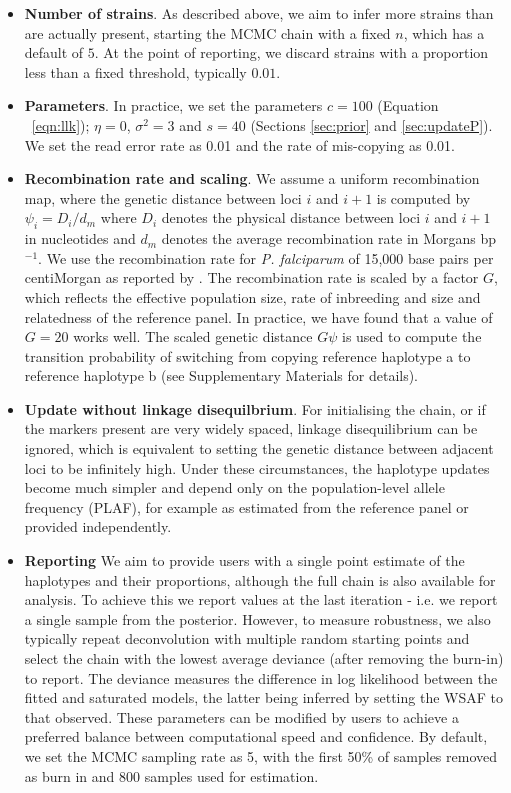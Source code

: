 \documentclass{bioinfo}
\begin{document}
\begin{itemize}
\item {\bf Number of strains}. As described above, we aim to infer more strains than are actually present, starting the MCMC chain with a fixed $n$, which has a default of $5$. At the point of reporting, we discard strains with a proportion less than a fixed threshold, typically $0.01$.

\item {\bf Parameters}. In practice, we set the parameters $c=100$ (Equation ~\eqref{eqn:llk}); $\eta = 0$, $\sigma^2 = 3$ and $s=40$ (Sections \ref{sec:prior} and \ref{sec:updateP}).  We set the read error rate as 0.01 and the rate of mis-copying as 0.01.

\item {\bf Recombination rate and scaling}. We assume a uniform recombination map, where the genetic distance between loci $i$ and $i+1$ is computed by $\psi_i = D_i / d_m$ where $D_i$ denotes the physical distance between loci $i$ and $i+1$ in nucleotides and $d_m$ denotes the average recombination rate in Morgans bp$^{-1}$. We use the recombination rate for {\it P. falciparum} of 15,000 base pairs per centiMorgan as reported by \citet{Miles2016}. The recombination rate is scaled by a factor $G$, which reflects the effective population size, rate of inbreeding and size and relatedness of the reference panel.  In practice, we have found that a value of $G=20$ works well.  The scaled genetic distance $G\psi$ is used to compute the transition probability of switching from copying reference haplotype a to reference haplotype b (see Supplementary Materials for details).

\item {\bf Update without linkage disequilbrium}. For initialising the chain, or if the markers present are very widely spaced, linkage disequilibrium can be ignored, which is equivalent to setting the genetic distance between adjacent loci to be infinitely high.  Under these circumstances, the haplotype updates become much simpler and depend only on the population-level allele frequency (PLAF), for example as estimated from the reference panel or provided independently.

\item {\bf Reporting} We aim to provide users with a single point estimate of the haplotypes and their proportions, although the full chain is also available for analysis.  To achieve this we report values at the last iteration - i.e. we report a single sample from the posterior.  However, to measure robustness, we also typically repeat deconvolution with multiple random starting points and select the chain with the lowest average deviance (after removing the burn-in) to report. The deviance measures the difference in log likelihood between the fitted and saturated models, the latter being inferred by setting the WSAF to that observed.   These parameters can be modified by users to achieve a preferred balance between computational speed and confidence.  By default, we set the MCMC sampling rate as 5, with the first 50\% of samples removed as burn in and 800 samples used for estimation.


\end{itemize}
\end{document}
